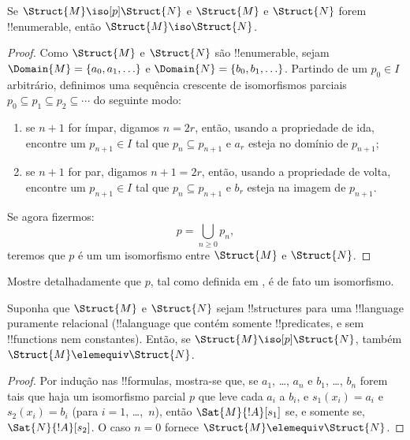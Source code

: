 \documentclass[../../../include/open-logic-section]{subfiles}
\begin{document}
\begin{thm}
  Se $\Struct{M} \iso[p] \Struct{N}$ e $\Struct{M}$ e
  $\Struct{N}$ forem !!{enumerable}, então $\Struct{M} \iso
  \Struct{N}$.
\end{thm}

\begin{proof}
  Como $\Struct{M}$ e $\Struct{N}$ são !!{enumerable}, sejam $\Domain{M} =
  \{a_0, a_1, \ldots \}$ e $\Domain{N} = \{b_0, b_1, \ldots \}$. Partindo
  de um $p_0 \in I$ arbitrário, definimos uma sequência crescente de
  isomorfismos parciais $p_0 \subseteq p_1 \subseteq p_2
  \subseteq \cdots$ do seguinte modo:
  \begin{enumerate}
  \item se $n+1$ for ímpar, digamos $n = 2r$, então, usando a propriedade
    de ida, encontre um $p_{n+1} \in I$ tal que $p_n \subseteq p_{n+1}$
    e $a_r$ esteja no domínio de $p_{n+1}$;
  \item se $n+1$ for par, digamos $n+1 =2r$, então, usando a propriedade
    de volta, encontre um $p_{n+1} \in I$ tal que $p_n \subseteq p_{n+1}$
    e $b_r$ esteja na imagem de $p_{n+1}$.
  \end{enumerate}
Se agora fizermos:
\[
p = \bigcup_{n\ge 0} p_n,
\]
teremos que $p$ é um um isomorfismo entre $\Struct{M}$ e
$\Struct{N}$.
\end{proof}

\begin{prob}
  Mostre detalhadamente que $p$, tal como definida em
  , é de fato um isomorfismo.
\end{prob}

\begin{thm}
  Suponha que $\Struct{M}$ e $\Struct{N}$ sejam !!{structure}s para uma
  !!{language} puramente relacional (!!a{language} que contém somente
  !!{predicate}s, e sem !!{function}s nem constantes). Então, se
  $\Struct{M} \iso[p] \Struct{N}$, também $\Struct{M} \elemequiv
  \Struct{N}$.
\end{thm}

\begin{proof}
  Por indução nas !!{formula}s, mostra-se que, se $a_1$, \dots, $a_n$ e
  $b_1$, \dots, $b_n$ forem tais que haja um isomorfismo parcial $p$
  que leve cada $a_i$ a $b_i$, e $s_1(x_i) =a_i$ e $s_2(x_i) =b_i$
  (para $i =1$, \dots,~$n$), então $\Sat{M}{!A}[s_1]$ se,
  e somente se, $\Sat{N}{!A}[s_2]$. O caso $n=0$
  fornece $\Struct{M} \elemequiv \Struct{N}$.
\end{proof}
\end{document}
